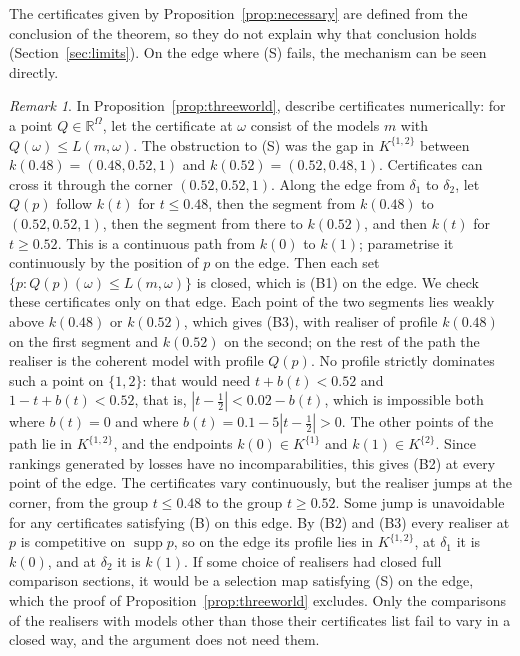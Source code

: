 \documentclass[11pt]{article}
\theoremstyle{definition}
\theoremstyle{remark}
\newtheorem{remark}[theorem]{Remark}
\newcommand{\R}{\mathbb R}
\newcommand{\supp}{\operatorname{supp}}
\begin{document}
The certificates given by Proposition~\ref{prop:necessary} are defined from the conclusion of the theorem, so they do not explain why that conclusion holds (Section~\ref{sec:limits}). On the edge where (S) fails, the mechanism can be seen directly.

\begin{remark}\label{rem:threeworld-bounds}
In Proposition~\ref{prop:threeworld}, describe certificates numerically: for a point $Q\in\R^\Omega$, let the certificate at $\omega$ consist of the models $m$ with $Q(\omega)\le L(m,\omega)$. The obstruction to (S) was the gap in $K^{\{1,2\}}$ between $k(0.48)=(0.48,0.52,1)$ and $k(0.52)=(0.52,0.48,1)$. Certificates can cross it through the corner $(0.52,0.52,1)$. Along the edge from $\delta_1$ to $\delta_2$, let $Q(p)$ follow $k(t)$ for $t\le0.48$, then the segment from $k(0.48)$ to $(0.52,0.52,1)$, then the segment from there to $k(0.52)$, and then $k(t)$ for $t\ge0.52$. This is a continuous path from $k(0)$ to $k(1)$; parametrise it continuously by the position of $p$ on the edge. Then each set $\{p:Q(p)(\omega)\le L(m,\omega)\}$ is closed, which is (B1) on the edge. We check these certificates only on that edge. Each point of the two segments lies weakly above $k(0.48)$ or $k(0.52)$, which gives (B3), with realiser of profile $k(0.48)$ on the first segment and $k(0.52)$ on the second; on the rest of the path the realiser is the coherent model with profile $Q(p)$. No profile strictly dominates such a point on $\{1,2\}$: that would need $t+b(t)<0.52$ and $1-t+b(t)<0.52$, that is, $|t-\tfrac12|<0.02-b(t)$, which is impossible both where $b(t)=0$ and where $b(t)=0.1-5|t-\tfrac12|>0$. The other points of the path lie in $K^{\{1,2\}}$, and the endpoints $k(0)\in K^{\{1\}}$ and $k(1)\in K^{\{2\}}$. Since rankings generated by losses have no incomparabilities, this gives (B2) at every point of the edge. The certificates vary continuously, but the realiser jumps at the corner, from the group $t\le0.48$ to the group $t\ge0.52$. Some jump is unavoidable for any certificates satisfying (B) on this edge. By (B2) and (B3) every realiser at $p$ is competitive on $\supp p$, so on the edge its profile lies in $K^{\{1,2\}}$, at $\delta_1$ it is $k(0)$, and at $\delta_2$ it is $k(1)$. If some choice of realisers had closed full comparison sections, it would be a selection map satisfying (S) on the edge, which the proof of Proposition~\ref{prop:threeworld} excludes. Only the comparisons of the realisers with models other than those their certificates list fail to vary in a closed way, and the argument does not need them.


\end{remark}
\end{document}

